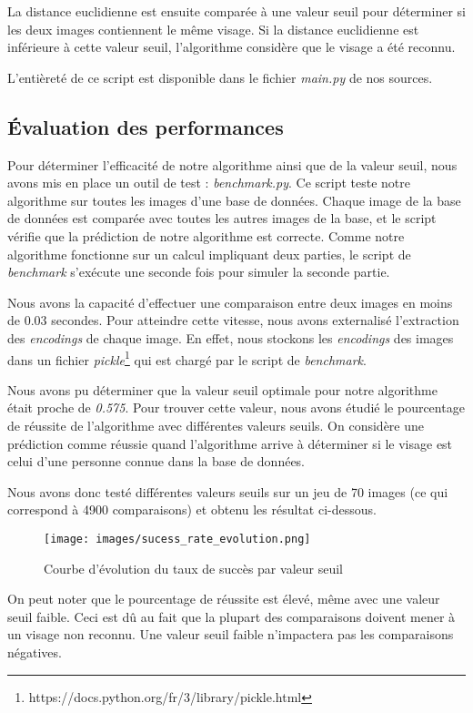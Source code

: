 \documentclass[12pt,a4paper]{article}
\begin{document}
La distance euclidienne est ensuite comparée à une valeur seuil pour déterminer si les deux images contiennent le même visage. Si la distance euclidienne est inférieure à cette valeur seuil, l'algorithme considère que le visage a été reconnu.

L'entièreté de ce script est disponible dans le fichier \textit{main.py} de nos sources.

\subsection{Évaluation des performances}
Pour déterminer l'efficacité de notre algorithme ainsi que de la valeur seuil, nous avons mis en place un outil de test : \textit{benchmark.py}. Ce script teste notre algorithme sur toutes les images d'une base de données. Chaque image de la base de données est comparée avec toutes les autres images de la base, et le script vérifie que la prédiction de notre algorithme est correcte. Comme notre algorithme fonctionne sur un calcul impliquant deux parties, le script de \textit{benchmark} s'exécute une seconde fois pour simuler la seconde partie.

Nous avons la capacité d'effectuer une comparaison entre deux images en moins de 0.03 secondes. Pour atteindre cette vitesse, nous avons externalisé l'extraction des \textit{encodings} de chaque image. En effet, nous stockons les \textit{encodings} des images dans un fichier \textit{pickle}\footnote{https://docs.python.org/fr/3/library/pickle.html} qui est chargé par le script de \textit{benchmark}.

Nous avons pu déterminer que la valeur seuil optimale pour notre algorithme était proche de \textit{0.575}. Pour trouver cette valeur, nous avons étudié le pourcentage de réussite de l'algorithme avec différentes valeurs seuils. On considère une prédiction comme réussie quand l'algorithme arrive à déterminer si le visage est celui d'une personne connue dans la base de données.

Nous avons donc testé différentes valeurs seuils sur un jeu de 70 images (ce qui correspond à 4900 comparaisons) et obtenu les résultat ci-dessous.

\begin{figure}[H]
    \centering
    \texttt{[image: images/sucess\_rate\_evolution.png]}
    \caption{Courbe d'évolution du taux de succès par valeur seuil}
    \label{fig:rate_evolution}
\end{figure}
On peut noter que le pourcentage de réussite est élevé, même avec une valeur seuil faible. Ceci est dû au fait que la plupart des comparaisons doivent mener à un visage non reconnu. Une valeur seuil faible n'impactera pas les comparaisons négatives.
\end{document}
